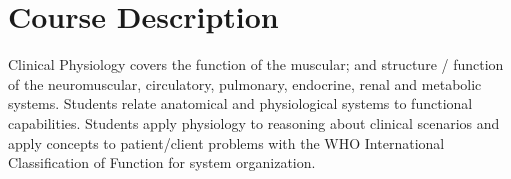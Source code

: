 \documentclass[letterpaper]{inzane_syllabus} %
\begin{document}


\makeprofile %

\vspace{2 cm}



\section{Course Description}
\vspace{0.5cm}

Clinical Physiology covers the function of the muscular; and structure / function of the neuromuscular, circulatory, pulmonary, endocrine, renal and metabolic systems. Students relate anatomical and physiological systems to functional capabilities. Students apply physiology to reasoning about clinical scenarios and apply concepts to patient/client problems with the WHO International Classification of Function for system organization.

\vspace{0.5cm}
\end{document}
